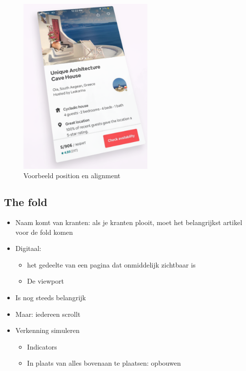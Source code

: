 \documentclass{article}
\begin{document}
\begin{figure}[H]
    \centering
    \includegraphics[width=0.6\textwidth]{img/Screenshot_20200302_084905.png}
    \caption{Voorbeeld position en alignment}
\end{figure}


\subsection{The fold}
\begin{itemize}
    \item Naam komt van kranten: als je kranten plooit, moet het belangrijkst artikel voor de fold komen
    \item Digitaal:
    \begin{itemize}
        \item het gedeelte van een pagina dat onmiddelijk zichtbaar is
        \item De viewport
    \end{itemize}
    \item Is nog steeds belangrijk
    \item Maar: iedereen scrollt
    \item Verkenning simuleren 
    \begin{itemize}
        \item Indicators
        \item In plaats van alles bovenaan te plaatsen: opbouwen
    \end{itemize}
\end{itemize}
\end{document}
